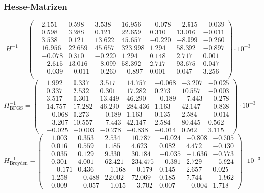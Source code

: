 \documentclass[xcolor = dvipsnames, notheorems]{beamer}
\theoremstyle{definition}
\begin{document}
\begin{frame}
\frametitle{Hesse-Matrizen}
	\tiny
		$$H^{-1} = \begin{pmatrix}
			&2.151 &0.598 &3.538 &16.956 &-0.078 &-2.615 &-0.039 \\
			&0.598 &3.288 &0.121 &22.659 &0.310 &13.016 &-0.011 \\
			&3.538 &0.121 &13.622 &45.657 &-0.220 &-8.099 &-0.260 \\
			&16.956 &22.659 &45.657 &323.998 &1.294 &58.392 &-0.897 \\
			&-0.078 &0.310 &-0.220 &1.294 &0.148 &2.717 &0.001 \\
			&-2.615 &13.016 &-8.099 &58.392 &2.717 &93.675 &0.047 \\
			&-0.039 &-0.011 &-0.260 &-0.897 &0.001 &0.047 &3.256 \\
		\end{pmatrix} \cdot 10^{-3}$$
		$$H^{-1}_\text{BFGS} = \begin{pmatrix}
			&1.992 &0.337 &3.517 &14.757 &-0.068 &-3.207 &-0.025 \\
			&0.337 &2.532 &0.301 &17.282 &0.273 &10.557 &-0.003 \\
			&3.517 &0.301 &13.449 &46.290 &-0.189 &-7.443 &-0.278 \\
			&14.757 &17.282 &46.290 &284.436 &1.163 &42.147 &-0.838 \\
			&-0.068 &0.273 &-0.189 &1.163 &0.135 &2.584 &-0.014 \\
			&-3.207 &10.557 &-7.443 &42.147 &2.584 &80.445 &0.562 \\
			&-0.025 &-0.003 &-0.278 &-0.838 &-0.014 &0.562 &3.115
		\end{pmatrix} \cdot 10^{-3}$$
		$$H^{-1}_\text{Broyden} = \begin{pmatrix}
			&1.003 &0.353 &2.534 &10.787 &-0.024 &-0.808 &-0.305 \\
			&0.016 &0.559 &1.185 &4.623 &0.082 &4.472 &-0.130 \\
			&0.035 &0.129 &9.330 &30.184 &-0.035 &-1.636 &-0.773 \\
			&0.301 &4.001 &62.421 &234.475 &-0.381 &2.729 &-5.924 \\
			&-0.171 &0.436 &-1.168 &-0.179 &0.145 &2.657 &0.025 \\
			&1.258 &-0.488 &22.002 &72.069 &0.185 &7.744 &-1.962 \\
			&0.009 &-0.057 &-1.015 &-3.702 &0.007 &-0.004 &1.718
		\end{pmatrix} \cdot 10^{-3}$$
	\normalsize
\end{frame}
\end{document}
